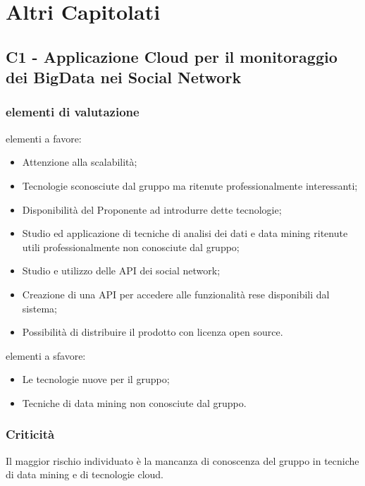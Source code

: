 \section{Altri Capitolati}
\subsection{C1 - Applicazione Cloud per il monitoraggio dei BigData nei Social Network}{
	\subsubsection{elementi di valutazione}{
		elementi a favore:
		\begin{itemize}
			\item Attenzione alla scalabilità;
			\item Tecnologie sconosciute dal gruppo ma ritenute professionalmente interessanti;
			\item Disponibilità del Proponente ad introdurre dette tecnologie;
			\item Studio ed applicazione di tecniche di analisi dei dati e data mining ritenute utili professionalmente non conosciute dal gruppo;
			\item Studio e utilizzo delle API dei social network;
			\item Creazione di una API per accedere alle funzionalità rese disponibili dal sistema;
			\item Possibilità di distribuire il prodotto con licenza open source.
		\end{itemize}
		
		elementi a sfavore:
		\begin{itemize}
			\item Le tecnologie nuove per il gruppo;
			\item Tecniche di data mining non conosciute dal gruppo.
		\end{itemize}
	}
	\subsubsection{Criticità}{
		Il maggior rischio individuato è la mancanza di conoscenza del gruppo in tecniche di data mining e di tecnologie cloud.
	}
}
